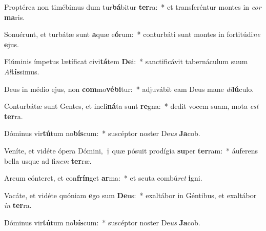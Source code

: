 \item Proptérea non timébimus dum tur\textbf{bá}bitur \textbf{ter}ra:~* et transferéntur montes in \textit{cor} \textbf{ma}ris.
\item Sonuérunt, et turbátæ sunt \textbf{a}quæ e\textbf{ó}rum:~* conturbáti sunt montes in fortitúdi\textit{ne} \textbf{e}jus.
\item Flúminis ímpetus lætíficat civi\textbf{tá}tem \textbf{De}i:~* sanctificávit tabernáculum suum \textit{Al}\textbf{tís}simus.
\item Deus in médio ejus, non \textbf{com}mo\textbf{vé}\textbf{bi}tur:~* adjuvábit eam Deus mane \textit{di}\textbf{lú}culo.
\item Conturbátæ sunt Gentes, et incli\textbf{ná}ta sunt \textbf{re}gna:~* dedit vocem suam, mota \textit{est} \textbf{ter}ra.
\item Dóminus vir\textbf{tú}tum no\textbf{bís}cum:~* suscéptor noster De\textit{us} \textbf{Ja}cob.
\item Veníte, et vidéte ópera Dómini,~† quæ pósuit prodígia \textbf{su}per \textbf{ter}ram:~* áuferens bella usque ad fi\textit{nem} \textbf{ter}ræ.
\item Arcum cónteret, et con\textbf{frín}get \textbf{ar}ma:~* et scuta combú\textit{ret} \textbf{i}gni.
\item Vacáte, et vidéte quóniam \textbf{e}go sum \textbf{De}us:~* exaltábor in Géntibus, et exaltábor \textit{in} \textbf{ter}ra.
\item Dóminus vir\textbf{tú}tum no\textbf{bís}cum:~* suscéptor noster De\textit{us} \textbf{Ja}cob.
